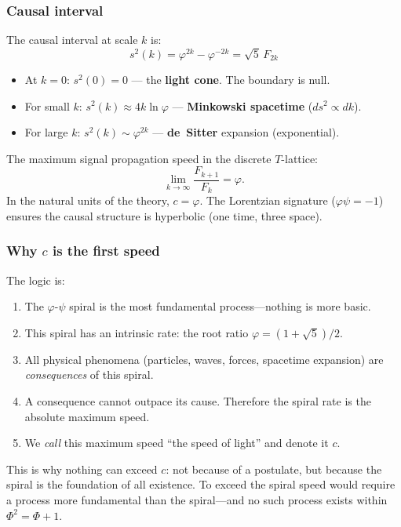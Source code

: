 \documentclass[12pt,a4paper]{article}
\begin{document}
\subsubsection{Causal interval}

The causal interval at scale $k$ is:
\begin{equation}
\boxed{\;s^2(k) = \varphi^{2k} - \varphi^{-2k} = \sqrt{5}\,F_{2k}\;}
\label{eq:causal}
\end{equation}

\begin{itemize}
\item At $k = 0$: $s^2(0) = 0$ --- the \textbf{light cone}. The boundary is null.
\item For small $k$: $s^2(k) \approx 4k\ln\varphi$ --- \textbf{Minkowski spacetime} ($ds^2 \propto dk$).
\item For large $k$: $s^2(k) \sim \varphi^{2k}$ --- \textbf{de~Sitter} expansion (exponential).
\end{itemize}

The maximum signal propagation speed in the discrete $T$-lattice:
\begin{equation}
\lim_{k\to\infty} \frac{F_{k+1}}{F_k} = \varphi.
\end{equation}
In the natural units of the theory, $c = \varphi$. The Lorentzian signature ($\varphi\psi = -1$) ensures the causal structure is hyperbolic (one time, three space).

\subsubsection{Why $c$ is the first speed}

The logic is:
\begin{enumerate}
\item The $\varphi$-$\psi$ spiral is the most fundamental process---nothing is more basic.
\item This spiral has an intrinsic rate: the root ratio $\varphi = (1+\sqrt{5})/2$.
\item All physical phenomena (particles, waves, forces, spacetime expansion) are \emph{consequences} of this spiral.
\item A consequence cannot outpace its cause. Therefore the spiral rate is the absolute maximum speed.
\item We \emph{call} this maximum speed ``the speed of light'' and denote it $c$.
\end{enumerate}

This is why nothing can exceed $c$: not because of a postulate, but because the spiral is the foundation of all existence. To exceed the spiral speed would require a process more fundamental than the spiral---and no such process exists within $\Phi^2 = \Phi + 1$.
\end{document}
